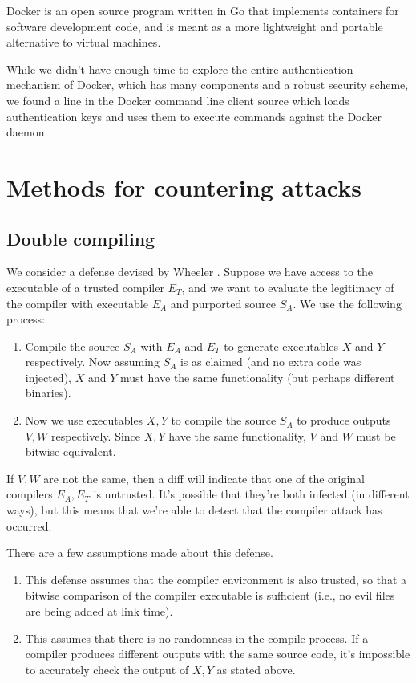 \documentclass[10pt]{sigplanconf}
\begin{document}
Docker \cite{docker} is an open source program written in Go that implements containers for software development code, and is meant as a more lightweight and portable alternative to virtual machines.

While we didn't have enough time to explore the entire authentication mechanism of Docker, which has many components and a robust security scheme, we found a line in the Docker command line client source which loads authentication keys and uses them to execute commands against the Docker daemon. 

\section{Methods for countering attacks}

\subsection{Double compiling}
We consider a defense devised by Wheeler \cite{wheeler}. Suppose we have access to the executable of a trusted compiler $E_T$, and we want to evaluate the legitimacy of the compiler with executable $E_A$ and purported source $S_A$. We use the following process:

\begin{enumerate}
\item Compile the source $S_A$ with $E_A$ and $E_T$ to generate executables $X$ and $Y$ respectively. Now assuming $S_A$ is as claimed (and no extra code was injected), $X$ and $Y$ must have the same functionality (but perhaps different binaries).
\item Now we use executables $X, Y$ to compile the source $S_A$ to produce outputs $V,W$ respectively. Since $X,Y$ have the same functionality, $V$ and $W$ must be bitwise equivalent.
\end{enumerate}

If $V,W$ are not the same, then a diff will indicate that one of the original compilers $E_A, E_T$ is untrusted. It’s possible that they’re both infected (in different ways), but this means that we’re able to detect that the compiler attack has occurred.

There are a few assumptions made about this defense.

\begin{enumerate}
\item This defense assumes that the compiler environment is also trusted, so that a bitwise comparison of the compiler executable is sufficient (i.e., no evil files are being added at link time).
\item This assumes that there is no randomness in the compile process. If a compiler produces different outputs with the same source code, it’s impossible to accurately check the output of $X,Y$ as stated above.
\end{enumerate}
\end{document}
